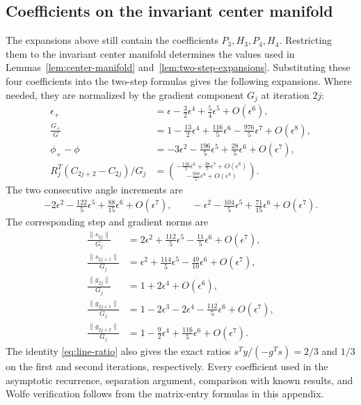 \documentclass[11pt]{article}
\newcommand{\norm}[1]{\lVert #1\rVert}
\begin{document}
\subsection{Coefficients on the invariant center manifold}

The expansions above still contain the coefficients $P_3,H_3,P_4,H_4$.
Restricting them to the invariant center manifold determines the values used
in Lemmas~\ref{lem:center-manifold} and~\ref{lem:two-step-expansions}.
Substituting these four coefficients into the two-step formulas gives the
following expansions.  Where needed, they are normalized by the gradient
component $G_j$ at iteration $2j$:
\begin{align*}
\epsilon_+
 &=\epsilon-\frac32\epsilon^4+\frac54\epsilon^5+O(\epsilon^6),\\
\frac{G_+}{G}
 &=1-\frac{13}{2}\epsilon^4+\frac{116}{5}\epsilon^6
   -\frac{976}{5}\epsilon^7+O(\epsilon^8),\\
\phi_+-\phi
 &=-3\epsilon^2-\frac{196}{5}\epsilon^5
   +\frac{28}{5}\epsilon^6+O(\epsilon^7),\\
R_j^T(C_{2j+2}-C_{2j})/G_j
 &=\binom{-\frac{116}{5}\epsilon^6+\frac{38}{5}\epsilon^7
           +O(\epsilon^8)}
          {-\frac{508}{5}\epsilon^8+O(\epsilon^9)}.
\end{align*}
The two consecutive angle increments are
\begin{align*}
-2\epsilon^2-\frac{122}{5}\epsilon^5
 +\frac{88}{15}\epsilon^6+O(\epsilon^7),\qquad
-\epsilon^2-\frac{104}{5}\epsilon^5
 +\frac{71}{15}\epsilon^6+O(\epsilon^7).
\end{align*}
The corresponding step and gradient norms are
\begin{align*}
\frac{\norm{s_{2j}}}{G_j}
 &=2\epsilon^2+\frac{112}{5}\epsilon^5
   -\frac{11}{5}\epsilon^6+O(\epsilon^7),\\
\frac{\norm{s_{2j+1}}}{G_j}
 &=\epsilon^2+\frac{114}{5}\epsilon^5
   -\frac{49}{10}\epsilon^6+O(\epsilon^7),\\
\frac{\norm{g_{2j}}}{G_j}
 &=1+2\epsilon^4+O(\epsilon^6),\\
\frac{\norm{g_{2j+1}}}{G_j}
 &=1-2\epsilon^3-2\epsilon^4-\frac{112}{5}\epsilon^6
   +O(\epsilon^7),\\
\frac{\norm{g_{2j+2}}}{G_j}
 &=1-\frac92\epsilon^4+\frac{116}{5}\epsilon^6
   +O(\epsilon^7).
\end{align*}
The identity \eqref{eq:line-ratio} also gives the exact ratios
$s^Ty/(-g^Ts)=2/3$ and $1/3$ on the first and second iterations,
respectively.  Every coefficient used in the
asymptotic recurrence, separation argument, comparison with known results, and
Wolfe verification follows from the matrix-entry formulas in this appendix.
\end{document}
